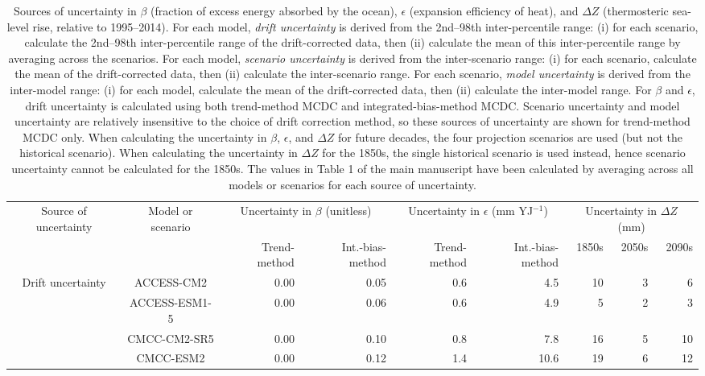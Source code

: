 \begin{table*}[t]
\centering
\caption{Sources of uncertainty in $\beta$ (fraction of excess energy absorbed by the ocean), $\epsilon$ (expansion efficiency of heat), and ${\Delta}Z$ (thermosteric sea-level rise, relative to 1995--2014). For each model, \emph{drift uncertainty} is derived from the 2nd--98th inter-percentile range: (i) for each scenario, calculate the 2nd--98th inter-percentile range of the drift-corrected data, then (ii) calculate the mean of this inter-percentile range by averaging across the scenarios. For each model, \emph{scenario uncertainty} is derived from the inter-scenario range: (i) for each scenario, calculate the mean of the drift-corrected data, then (ii) calculate the inter-scenario range. For each scenario, \emph{model uncertainty} is derived from the inter-model range: (i) for each model, calculate the mean of the drift-corrected data, then (ii) calculate the inter-model range. For $\beta$ and $\epsilon$, drift uncertainty is calculated using both trend-method MCDC and integrated-bias-method MCDC. Scenario uncertainty and model uncertainty are relatively insensitive to the choice of drift correction method, so these sources of uncertainty are shown for trend-method MCDC only. When calculating the uncertainty in $\beta$, $\epsilon$, and ${\Delta}Z$ for future decades, the four projection scenarios are used (but not the historical scenario). When calculating the uncertainty in ${\Delta}Z$ for the 1850s, the single historical scenario is used instead, hence scenario uncertainty cannot be calculated for the 1850s. The values in Table 1 of the main manuscript have been calculated by averaging across all models or scenarios for each source of uncertainty.}
\begin{tabular}{c|c|rr|rr|rrr}
\toprule
Source of uncertainty & Model or scenario & \multicolumn{2}{c|}{Uncertainty in $\beta$ (unitless)} & \multicolumn{2}{c|}{Uncertainty in $\epsilon$ (mm YJ$^{-1}$)} & \multicolumn{3}{c}{Uncertainty in ${\Delta}Z$ (mm)} \\
 &  & Trend-method & Int.-bias-method & Trend-method & Int.-bias-method & 1850s & 2050s & 2090s \\
\midrule
\multirow[c]{16}{*}{Drift uncertainty} & ACCESS-CM2 & 0.00 & 0.05 & 0.6 & 4.5 & 10 & 3 & 6 \\
 & ACCESS-ESM1-5 & 0.00 & 0.06 & 0.6 & 4.9 & 5 & 2 & 3 \\
 & CMCC-CM2-SR5 & 0.00 & 0.10 & 0.8 & 7.8 & 16 & 5 & 10 \\
 & CMCC-ESM2 & 0.00 & 0.12 & 1.4 & 10.6 & 19 & 6 & 12 \\

\end{tabular}
\end{table*}
